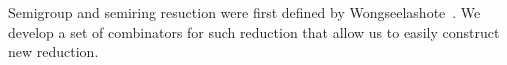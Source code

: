   Semigroup and semiring resuction
  were first defined by
  Wongseelashote~\cite{Wongseelashote79}. 
  We develop a set of combinators for such reduction
  that allow us to easily construct new reduction. 
